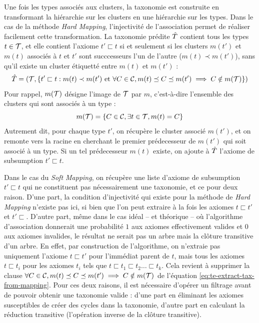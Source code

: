 Une fois les types associés aux clusters, la taxonomie est construite en transformant la hiérarchie sur les clusters en une hiérarchie sur les types. Dans le cas de la méthode \textit{Hard Mapping}, l'injectivité de l'association permet de réaliser facilement cette transformation. La taxonomie prédite $\Tpred$ contient tous les types $t \in \cal{T}$, et elle contient l'axiome $t' \sqsubset t$ si et seulement si les clusters $m(t')$ et $m(t)$ associés à $t$ et $t'$ sont succcesseurs l'un de l'autre ($m(t) \prec m(t')$), sans qu'il existe un cluster étiquetté entre $m(t)$ et $m(t')$ :
\begin{equation}
    \Tpred = (\cal{T}, \{t' \sqsubset t : m(t) \prec m(t') \text{ et } \forall C \in \cal{C}, m(t) \preceq C \preceq m(t') \implies C \notin m(\cal{T}) \})
    \label{eq:te-extract-tax-from-mapping}
\end{equation}
Pour rappel, $m(\cal{T})$ désigne l'image de $\cal{T}$ par $m$, c'est-à-dire l'ensemble des clusters qui sont associés à un type :
\begin{equation}
    m(\cal{T}) = \{ C \in \cal{C}, \exists t \in \cal{T}, m(t) = C \}
\end{equation}
Autrement dit, pour chaque type $t'$, on récupère le cluster associé $m(t')$, et on remonte vers la racine en cherchant le premier prédecesseur de $m(t')$ qui soit associé à un type. Si un tel prédecesseur $m(t)$ existe, on ajoute à $\Tpred$ l'axiome de subsumption $t' \sqsubset t$.

Dans le cas du \textit{Soft Mapping}, on récupère une liste d'axiome de subsumption $t' \sqsubset t$ qui ne constituent pas nécessairement une taxonomie, et ce pour deux raison. D'une part, la condition d'injectivité qui existe pour la méthode de \textit{Hard Mapping} n'existe pas ici, si bien que l'on peut extraire à la fois les axiomes $t \sqsubset t'$ et $t' \sqsubset$. D'autre part, même dans le cas idéal – et théorique – où l'algorithme d'association donnerait une probabilité $1$ aux axiomes effectivement valides et $0$ aux axiomes invalides, le résultat ne serait pas un arbre mais la clôture transitive d'un arbre. En effet, par construction de l'algorithme, on n'extraie pas uniquement l'axiome $t \sqsubset t'$ pour l'immédiat parent de $t$, mais tous les axiomes $t \sqsubset t_i$ pour les axiomes $t_i$ tels que $t \sqsubset t_1 \sqsubset t_2 \ldots \sqsubset t_k$. Cela revient à supprimer la clause $\forall C \in \cal{C}, m(t) \preceq C \preceq m(t') \implies C \notin m(\cal{T})$ de l'équation \ref{eq:te-extract-tax-from-mapping}. Pour ces deux raisons, il est nécessaire d'opérer un filtrage avant de pouvoir obtenir une taxonomie valide : d'une part en éliminant les axiomes susceptibles de créer des cycles dans la taxonomie, d'autre part en calculant la réduction transitive (l'opération inverse de la clôture transitive).

